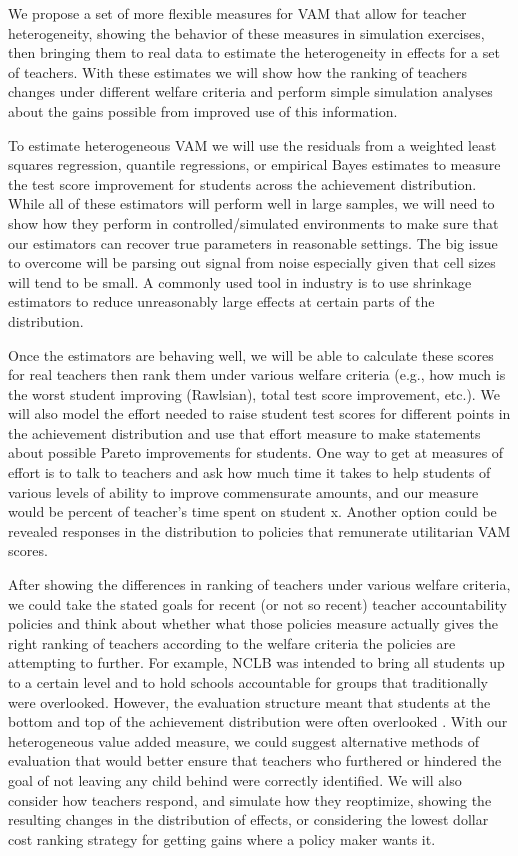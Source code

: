 \documentclass[letterpaper,12pt]{article}
\begin{document}
We propose a set of more flexible measures for VAM that allow for teacher heterogeneity, showing the behavior of these measures in simulation exercises, then bringing them to real data to estimate the heterogeneity in effects for a set of teachers. With these estimates we will show how the ranking of teachers changes under different welfare criteria and perform simple simulation analyses about the gains possible from improved use of this information.

To estimate heterogeneous VAM we will use the residuals from a weighted least squares regression, quantile regressions, or empirical Bayes estimates to measure the test score improvement for students across the achievement distribution. While all of these estimators will perform well in large samples, we will need to show how they perform in controlled/simulated environments to make sure that our estimators can recover true parameters in reasonable settings. The big issue to overcome will be parsing out signal from noise especially given that cell sizes will tend to be small. A commonly used tool in industry is to use shrinkage estimators to reduce unreasonably large effects at certain parts of the distribution.

Once the estimators are behaving well, we will be able to calculate these scores for real teachers then rank them under various welfare criteria (e.g., how much is the worst student improving (Rawlsian), total test score improvement, etc.). We will also model the effort needed to raise student test scores for different points in the achievement distribution and use that effort measure to make statements about possible Pareto improvements for students. One way to get at measures of effort is to talk to teachers and ask how much time it takes to help students of various levels of ability to improve commensurate amounts, and our measure would be percent of teacher’s time spent on student x. Another option could be revealed responses in the distribution to policies that remunerate utilitarian VAM scores.

After showing the differences in ranking of teachers under various welfare criteria, we could take the stated goals for recent (or not so recent) teacher accountability policies and think about whether what those policies measure actually gives the right ranking of teachers according to the welfare criteria the policies are attempting to further. For example, NCLB was intended to bring all students up to a certain level and to hold schools accountable for groups that traditionally were overlooked. However, the evaluation structure meant that students at the bottom and top of the achievement distribution were often overlooked \citep{neal2010left}. With our heterogeneous value added measure, we could suggest alternative methods of evaluation that would better ensure that teachers who furthered or hindered the goal of not leaving any child behind were correctly identified. We will also consider how teachers respond, and simulate how they reoptimize, showing the resulting changes in the distribution of effects, or considering the lowest dollar cost ranking strategy for getting gains where a policy maker wants it.
\end{document}
